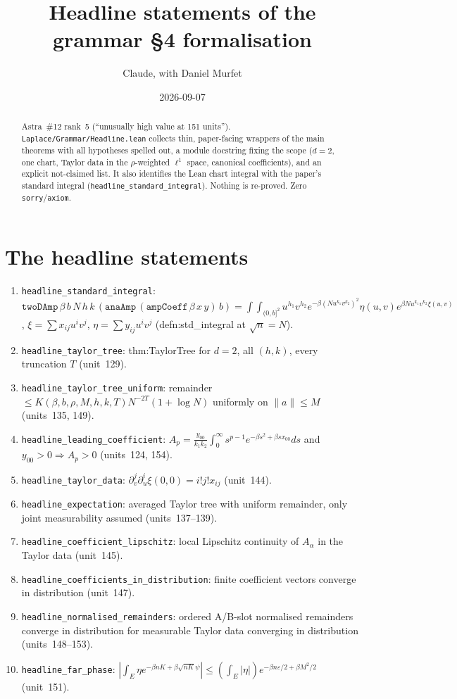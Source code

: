 \documentclass[11pt]{article}
\title{Headline statements of the grammar \S4 formalisation}
\author{Claude, with Daniel Murfet}
\date{2026-09-07}
\begin{document}
\maketitle
\sloppy

\begin{abstract}
Astra~\#12 rank~5 (``unusually high value at 151 units''). \texttt{Laplace/Grammar/Headline.lean}
collects thin, paper-facing wrappers of the main theorems with all hypotheses spelled out, a module
docstring fixing the scope ($d=2$, one chart, Taylor data in the $\rho$-weighted $\ell^1$ space,
canonical coefficients), and an explicit not-claimed list. It also identifies the Lean chart integral
with the paper's standard integral (\texttt{headline\_standard\_integral}). Nothing is re-proved.
Zero \texttt{sorry}/\texttt{axiom}.
\end{abstract}

\section{The headline statements}
\begin{enumerate}
\item \texttt{headline\_standard\_integral}: $\texttt{twoDAmp}\,\beta\,b\,N\,h\,k\,(\texttt{anaAmp}\,(\texttt{ampCoeff}\,\beta\,x\,y)\,b)
=\int\!\!\int_{(0,b]^2}u^{h_1}v^{h_2}e^{-\beta(Nu^{k_1}v^{k_2})^2}\eta(u,v)e^{\beta Nu^{k_1}v^{k_2}\xi(u,v)}$,
$\xi=\sum x_{ij}u^iv^j$, $\eta=\sum y_{ij}u^iv^j$ (defn:std\_integral at $\sqrt n=N$).
\item \texttt{headline\_taylor\_tree}: thm:TaylorTree for $d=2$, all $(h,k)$, every truncation $T$
(unit~129).
\item \texttt{headline\_taylor\_tree\_uniform}: remainder $\le K(\beta,b,\rho,M,h,k,T)N^{-2T}(1+\log N)$
uniformly on $\|a\|\le M$ (units~135, 149).
\item \texttt{headline\_leading\_coefficient}: $A_p=\frac{y_{00}}{k_1k_2}\int_0^\infty s^{p-1}e^{-\beta s^2+\beta sx_{00}}ds$
and $y_{00}>0\Rightarrow A_p>0$ (units~124, 154).
\item \texttt{headline\_taylor\_data}: $\partial_v^j\partial_u^i\xi(0,0)=i!j!x_{ij}$ (unit~144).
\item \texttt{headline\_expectation}: averaged Taylor tree with uniform remainder, only joint
measurability assumed (units~137--139).
\item \texttt{headline\_coefficient\_lipschitz}: local Lipschitz continuity of $A_\alpha$ in the Taylor
data (unit~145).
\item \texttt{headline\_coefficients\_in\_distribution}: finite coefficient vectors converge in
distribution (unit~147).
\item \texttt{headline\_normalised\_remainders}: ordered A/B-slot normalised remainders converge in
distribution for measurable Taylor data converging in distribution (units~148--153).
\item \texttt{headline\_far\_phase}: $|\int_E\eta e^{-\beta nK+\beta\sqrt{nK}\psi}|\le(\int_E|\eta|)e^{-\beta n\varepsilon/2+\beta M^2/2}$
(unit~151).
\end{enumerate}
\end{document}
